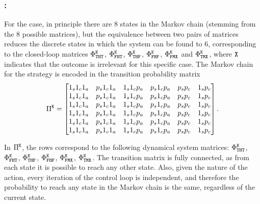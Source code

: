 \subsubsection*{\tK{}:}
For the \tK{} case, in principle there are $8$ states in the Markov chain (stemming from the $8$ possible matrices), but the equivalence between two pairs of matrices reduces the discrete states in which the system can be found to $6$, corresponding to the closed-loop matrices $\Phi^{\texttt{K}}_{\texttt{T}\texttt{H}\texttt{T}}$, $\Phi^{\texttt{K}}_{\texttt{F}\texttt{H}\texttt{T}}$, $\Phi^{\texttt{K}}_{\texttt{T}\texttt{H}\texttt{F}}$, $\Phi^{\texttt{K}}_{\texttt{F}\texttt{H}\texttt{F}}$, $\Phi^{\texttt{K}}_{\texttt{F}\texttt{M}\texttt{X}}$ and $\Phi^{\texttt{K}}_{\texttt{T}\texttt{M}\texttt{X}}$, where $\texttt{X}$ indicates that the outcome is irrelevant for this specific case.
The Markov chain for the \tK{} strategy is encoded in the transition probability matrix
{\small
\begin{equation}
\label{eq:pikill}
\Pi^{\Kill} = \begin{bmatrix}
        1_s1_c1_a & p_s1_c1_a & 1_s1_cp_a & p_s1_cp_a & p_sp_c & 1_sp_c \\
        1_s1_c1_a & p_s1_c1_a & 1_s1_cp_a & p_s1_cp_a & p_sp_c & 1_sp_c \\
        1_s1_c1_a & p_s1_c1_a & 1_s1_cp_a & p_s1_cp_a & p_sp_c & 1_sp_c \\
        1_s1_c1_a & p_s1_c1_a & 1_s1_cp_a & p_s1_cp_a & p_sp_c & 1_sp_c \\
        1_s1_c1_a & p_s1_c1_a & 1_s1_cp_a & p_s1_cp_a & p_sp_c & 1_sp_c \\
        1_s1_c1_a & p_s1_c1_a & 1_s1_cp_a & p_s1_cp_a & p_sp_c & 1_sp_c \\
\end{bmatrix}.
\end{equation}
}

In $\Pi^{\texttt{K}}$, the rows correspond to the following dynamical system matrices: $\Phi^{\texttt{K}}_{\texttt{T}\texttt{H}\texttt{T}}$, $\Phi^{\texttt{K}}_{\texttt{F}\texttt{H}\texttt{T}}$, $\Phi^{\texttt{K}}_{\texttt{T}\texttt{H}\texttt{F}}$, $\Phi^{\texttt{K}}_{\texttt{F}\texttt{H}\texttt{F}}$, $\Phi^{\texttt{K}}_{\texttt{F}\texttt{M}\texttt{X}}$, $\Phi^{\texttt{K}}_{\texttt{T}\texttt{M}\texttt{X}}$.
The transition matrix is fully connected, as from each state it is possible to reach any other state.
Also, given the nature of the \tK{} action, every iteration of the control loop is independent, and therefore the probability to reach any state in the Markov chain is the same, regardless of the current state.

